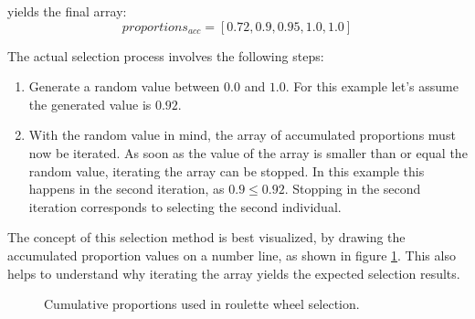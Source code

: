 \documentclass[english,examples]{isasthesis}
\begin{document}
\begin{Example}
    yields the final array:
    \begin{equation}
        proportions_{acc} = [ 0.72, 0.9, 0.95, 1.0, 1.0 ]
    \end{equation}

    The actual selection process involves the following steps:
    \begin{enumerate}
        \item   Generate a random value between $0.0$ and $1.0$. For this
                example let's assume the generated value is $0.92$.

        \item   With the random value in mind, the array of accumulated
                proportions must now be iterated. As soon as the value of the
                array is smaller than or equal the random value, iterating the
                array can be stopped.
                In this example this happens in the second iteration, as
                $0.9 \leqslant 0.92$. Stopping in the second iteration
                corresponds to selecting the second individual.
    \end{enumerate}

    The concept of this selection method is best visualized, by drawing the
    accumulated proportion values on a number line, as shown in figure
    \ref{fig:number_line}.
    This also helps to understand why iterating the array yields the expected
    selection results.

    \begin{figure}[h!]
        \centering
        
        \caption{Cumulative proportions used in roulette wheel selection.}
        \label{fig:number_line}
    \end{figure}
\end{Example}

\end{document}
